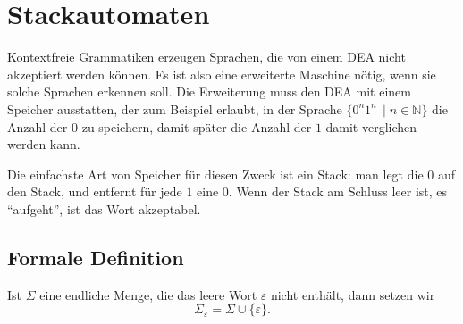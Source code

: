 %
%
%
\section{Stackautomaten}
%
Kontextfreie Grammatiken erzeugen Sprachen, die von einem DEA nicht
akzeptiert werden können.
Es ist also eine erweiterte Maschine
nötig, wenn sie solche Sprachen erkennen soll.
Die Erweiterung muss
den DEA mit einem Speicher ausstatten, der zum Beispiel erlaubt, 
in der Sprache $\{0^n1^n\,\;|\; n\in\mathbb N\}$ die Anzahl der
$0$ zu speichern, damit später die Anzahl der $1$
damit verglichen werden kann.

Die einfachste Art von Speicher für diesen Zweck ist ein Stack:
man legt die $0$ auf den Stack, und entfernt für jede $1$ eine 
$0$.
Wenn der Stack am Schluss leer ist, es ``aufgeht'', ist das
Wort akzeptabel.

\subsection{Formale Definition}
\begin{definition}
Ist $\Sigma$ eine endliche Menge, die das leere Wort $\varepsilon$
nicht enthält, dann setzen wir 
\[
\Sigma_\varepsilon = \Sigma\cup \{\varepsilon\}.
\]
\end{definition}

